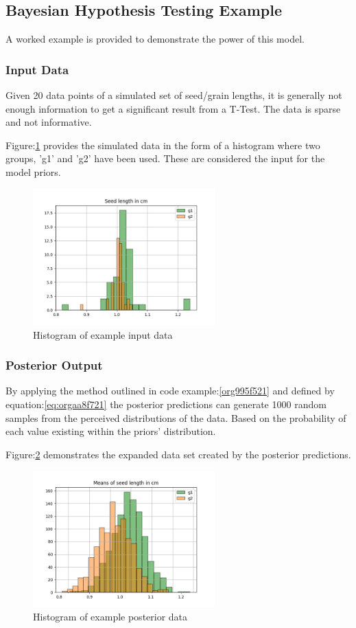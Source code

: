 \documentclass[11pt]{report}
\begin{document}
\subsection{Bayesian Hypothesis Testing Example}
\label{sec:org17db0ec}
A worked example is provided to demonstrate the power of this model.
\subsubsection{Input Data}
\label{sec:org6086ac9}
Given 20 data points of a simulated set of seed/grain lengths, it is generally not enough information to get a significant result from a T-Test. The data is sparse and not informative.

Figure:\ref{fig:org189a8a5} provides the simulated data in the form of a histogram where two groups, 'g1' and 'g2' have been used. These are considered the input for the model priors.
\begin{figure}[htbp]
\centering
\includegraphics[width=7cm]{./images/exampledata.png}
\caption{\label{fig:org189a8a5}
Histogram of example input data}
\end{figure}

\subsubsection{Posterior Output}
\label{sec:org64eca83}
By applying the method outlined in code example:\ref{org995f521} and defined by equation:\ref{eq:orgaa8f721} the posterior predictions can generate 1000 random samples from the perceived distributions of the data. Based on the probability of each value existing within the priors' distribution.

Figure:\ref{fig:org564172a} demonstrates the expanded data set created by the posterior predictions.
\begin{figure}[htbp]
\centering
\includegraphics[width=7cm]{./images/examplebayes.png}
\caption{\label{fig:org564172a}
Histogram of example posterior data}
\end{figure}
\end{document}
